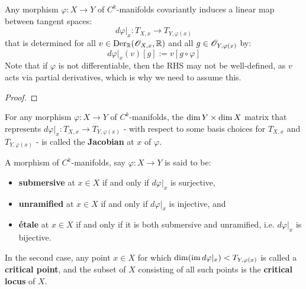        \begin{corollary} \label{coro functoriality_of_tangent_spaces}
            Any morphism $\varphi: X \to Y$ of $C^k$-manifolds covariantly induces a linear map between tangent spaces:
                $$d\varphi|_x: T_{X, x} \to T_{Y, \varphi(x)}$$
            that is determined for all $v \in \mathrm{Der}_{\mathbb{R}}(\mathscr{O}_{X, x}, \mathbb{R})$ and all $g \in \mathscr{O}_{Y, \varphi(x)}$ by:
                $$d\varphi|_x( v )[g] := v[g \circ \varphi]$$
            Note that if $\varphi$ is not differentiable, then the RHS may not be well-defined, as $v$ acts via partial derivatives, which is why we need to assume this. 
        \end{corollary}
            \begin{proof}
                
            \end{proof}
        \begin{definition}[Jacobians] \label{def: jacobian}
            For any morphism $\varphi: X \to Y$ of $C^k$-manifolds, the $\dim Y \x \dim X$ matrix that represents $d\varphi|_x: T_{X, x} \to T_{Y, \varphi(x)}$ - with respect to some basis choices for $T_{X, x}$ and $T_{Y, \varphi(x)}$ - is called the \textbf{Jacobian} at $x$ of $\varphi$. 
        \end{definition}
        \begin{definition} \label{def: submersive_unramified_and_etale_morphisms}
            A morphism of $C^k$-manifolds, say $\varphi: X \to Y$ is said to be:
            \begin{itemize}
                \item \textbf{submersive} at $x \in X$ if and only if $d\varphi|_x$ is surjective,
                \item \textbf{unramified} at $x \in X$ if and only if $d\varphi|_x$ is injective, and
                \item \textbf{\'etale} at $x \in X$ if and only if it is both submersive and unramified, i.e. $d\varphi|_x$ is bijective.
            \end{itemize}
            In the second case, any point $x \in X$ for which $\dim( \operatorname{im} d\varphi|_x ) < T_{Y, \varphi(x)}$ is called a \textbf{critical point}, and the subset of $X$ consisting of all such points is the \textbf{critical locus} of $X$.
        \end{definition}